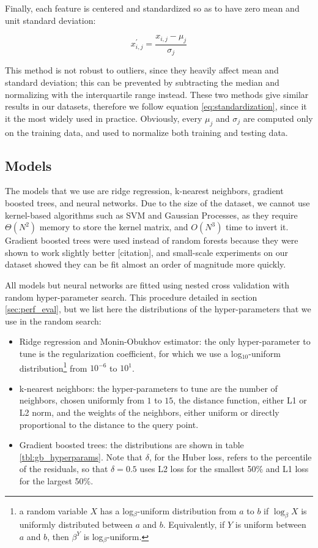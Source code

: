 \documentclass[12pt]{book}
\begin{document}
Finally, each feature is centered and standardized so as to have zero mean and unit standard deviation:

\begin{equation}
\label{eq:standardization}
x^\prime_{i,j}=\frac{x_{i,j}-\mu_j}{\sigma_j}
\end{equation}

This method is not robust to outliers, since they heavily affect mean and standard deviation; this can be prevented by subtracting the median and normalizing with the interquartile range instead. These two methods give similar results in our datasets, therefore we follow equation \ref{eq:standardization}, since it it the most widely used in practice. Obviously, every $\mu_j$ and $\sigma_j$ are computed only on the training data, and used to normalize both training and testing data.

\subsection{Models}

The models that we use are ridge regression, k-nearest neighbors, gradient boosted trees, and neural networks. Due to the size of the dataset, we cannot use kernel-based algorithms such as SVM and Gaussian Processes, as they require $\Theta(N^2)$ memory to store the kernel matrix, and $O(N^3)$ time to invert it. Gradient boosted trees were used instead of random forests because they were shown to work slightly better [citation], and small-scale experiments on our dataset showed they can be fit almost an order of magnitude more quickly.

All models but neural networks are fitted using nested cross validation with random hyper-parameter search. This procedure detailed in section \ref{sec:perf_eval}, but we list here the distributions of the hyper-parameters that we use in the random search:

\begin{itemize}
\item Ridge regression and Monin-Obukhov estimator: the only hyper-parameter to tune is the regularization coefficient, for which we use a log$_{10}$-uniform distribution\footnote{a random variable $X$ has a log$_\beta$-uniform distribution from $a$ to $b$ if $\log_\beta X$ is uniformly distributed between $a$ and $b$. Equivalently, if $Y$ is uniform between $a$ and $b$, then $\beta^Y$ is log$_\beta$-uniform.} from $10^{-6}$ to $10^{1}$.

\item k-nearest neighbors: the hyper-parameters to tune are the number of neighbors, chosen uniformly from $1$ to $15$, the distance function, either L1 or L2 norm, and the weights of the neighbors, either uniform or directly proportional to the distance to the query point.

\item Gradient boosted trees: the distributions are shown in table \ref{tbl:gb_hyperparams}. Note that $\delta$, for the Huber loss, refers to the percentile of the residuals, so that $\delta=0.5$ uses L2 loss for the smallest 50\% and L1 loss for the largest 50\%.
\end{itemize}
\end{document}
